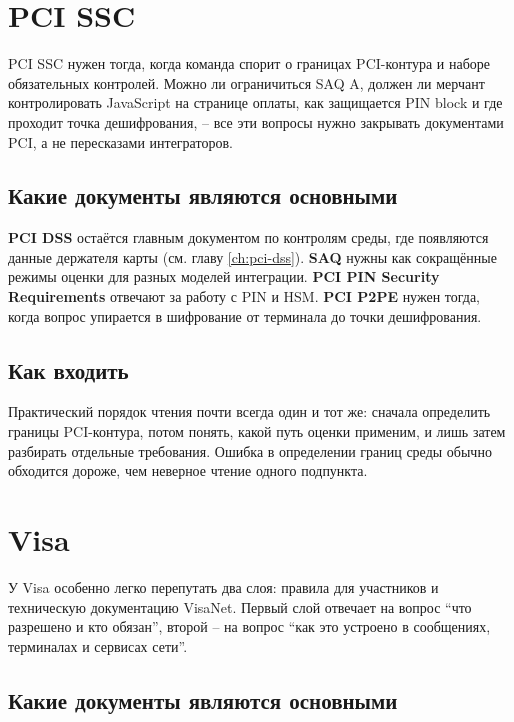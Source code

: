\section{PCI SSC}
\label{sec:ps-pci}

PCI SSC нужен тогда, когда команда спорит о границах PCI-контура
и наборе обязательных контролей. Можно ли ограничиться SAQ A, должен ли
мерчант контролировать JavaScript на странице оплаты, как защищается
PIN block и где проходит точка дешифрования, -- все эти вопросы
нужно закрывать документами PCI, а не пересказами интеграторов.

\subsection*{Какие документы являются основными}

\textbf{PCI DSS} остаётся главным документом по контролям среды,
где появляются данные держателя карты
(см. главу \ref{ch:pci-dss}). \textbf{SAQ} нужны как сокращённые
режимы оценки для разных моделей интеграции.
\textbf{PCI PIN Security Requirements} отвечают за работу
с PIN и HSM. \textbf{PCI P2PE} нужен тогда, когда вопрос
упирается в шифрование от терминала до точки дешифрования.




\subsection*{Как входить}

Практический порядок чтения почти всегда один и тот же: сначала
определить границы PCI-контура, потом понять, какой путь оценки
применим, и лишь затем разбирать отдельные требования. Ошибка
в определении границ среды обычно обходится дороже, чем неверное
чтение одного подпункта.

\section{Visa}
\label{sec:ps-visa}

У Visa особенно легко перепутать два слоя: правила
для участников и техническую документацию VisaNet. Первый слой
отвечает на вопрос \enquote{что разрешено и кто обязан}, второй --
на вопрос \enquote{как это устроено в сообщениях, терминалах
и сервисах сети}.

\subsection*{Какие документы являются основными}

